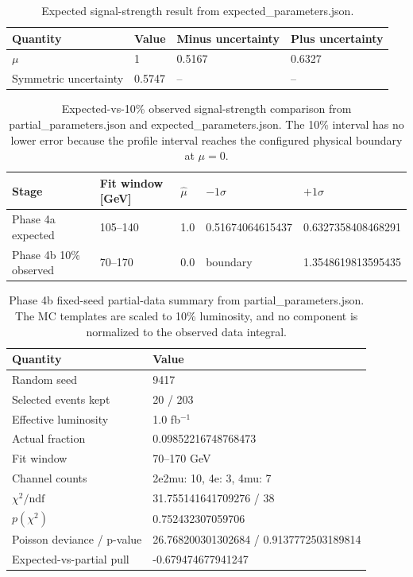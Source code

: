 \documentclass[11pt]{article}
\begin{document}
\begin{table}[htbp]
\centering
\caption{Expected signal-strength result from expected\_parameters.json.}
\begin{tabular}{llll}
\toprule
Quantity & Value & Minus uncertainty & Plus uncertainty \\ 
\midrule
$\mu$ & 1 & 0.5167 & 0.6327 \\
Symmetric uncertainty & 0.5747 & -- & -- \\ 
\bottomrule
\end{tabular}
\label{tab:mu-result}
\end{table}

\begin{table}[htbp]
\centering
\caption{Expected-vs-10\% observed signal-strength comparison from partial\_parameters.json and expected\_parameters.json. The 10\% interval has no lower error because the profile interval reaches the configured physical boundary at $\mu=0$.}
\begin{tabular}{lllll}
\toprule
Stage & Fit window [GeV] & $\hat{\mu}$ & $-1\sigma$ & $+1\sigma$ \\ 
\midrule
Phase 4a expected & 105--140 & 1.0 & 0.51674064615437 & 0.6327358408468291 \\
Phase 4b 10\% observed & 70--170 & 0.0 & boundary & 1.3548619813595435 \\
\bottomrule
\end{tabular}
\label{tab:partial-mu-result}
\end{table}

\begin{table}[htbp]
\centering
\caption{Phase 4b fixed-seed partial-data summary from partial\_parameters.json. The MC templates are scaled to 10\% luminosity, and no component is normalized to the observed data integral.}
\begin{tabular}{ll}
\toprule
Quantity & Value \\ 
\midrule
Random seed & 9417 \\
Selected events kept & 20 / 203 \\
Effective luminosity & 1.0 fb$^{-1}$ \\
Actual fraction & 0.09852216748768473 \\
Fit window & 70--170 GeV \\
Channel counts & 2e2mu: 10, 4e: 3, 4mu: 7 \\
$\chi^2/\mathrm{ndf}$ & 31.755141641709276 / 38 \\
$p(\chi^2)$ & 0.752432307059706 \\
Poisson deviance / p-value & 26.768200301302684 / 0.9137772503189814 \\
Expected-vs-partial pull & -0.679474677941247 \\
\bottomrule
\end{tabular}
\label{tab:partial-gof}
\end{table}
\end{document}
